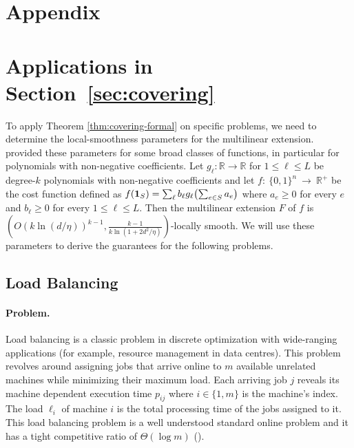 
\section*{Appendix}

\section{Applications in Section~\ref{sec:covering}}
To apply Theorem \ref{thm:covering-formal} on specific problems, we need to determine the local-smoothness parameters for the multilinear extension.
\cite{Thang20:Online-Primal-Dual} provided these parameters for some broad classes of functions, in particular for polynomials with non-negative coefficients. Let $g_{\ell}: \mathbb{R} \rightarrow \mathbb{R}$ for $1 \leq \ell \leq L$
be degree-$k$ polynomials with non-negative coefficients and let $f:~\{0,1\}^{n}~\rightarrow~\mathbb{R}^{+}$ be the cost function
defined as $f(\mathbf{1}_{S}) = \sum_{\ell} b_{\ell} g_{\ell}\bigl( \sum_{e \in S} a_{e} \bigr)$ where $a_{e} \geq 0$ for every
$e$ and $b_{\ell} \geq 0$ for every $1 \leq \ell \leq L$.
Then the multilinear extension $F$ of $f$ is $(O(k \ln(d/\eta))^{k-1}, \frac{k-1}{k \ln(1 + 2d^{2}/\eta)})$-locally smooth.
We will use these parameters to derive the guarantees for the following problems.




\subsection{Load Balancing}

\paragraph{Problem.}
Load balancing is a classic problem in discrete optimization with wide-ranging applications (for example, resource management in data centres).
This problem revolves around assigning jobs that arrive online to $m$ available unrelated machines while minimizing their maximum load.
Each arriving job $j$ reveals its machine dependent execution time $p_{ij}$ where $i \in \{1, m\}$ is the machine's index. The load $\ell_{i}$ of machine $i$ is the total processing time of the jobs assigned
to it. This load balancing problem is a well understood standard online problem and it has a tight competitive ratio of $\Theta(\log m)$ (\cite{BorodinEl-Yaniv05:Online-computation,Caragiannis08:Better-bounds}).

